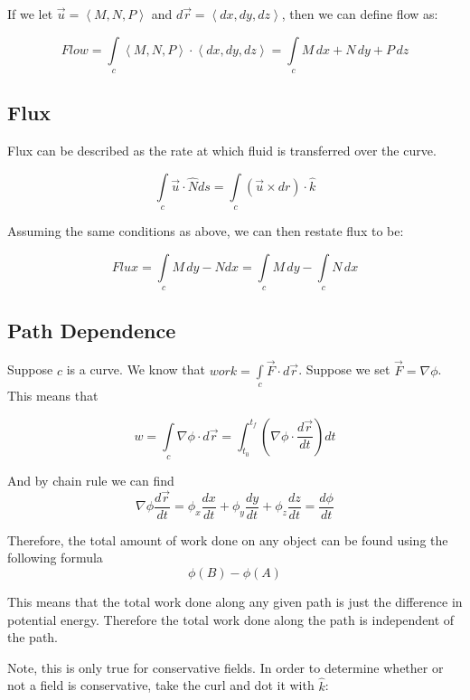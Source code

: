 \documentclass{article}
\newcommand{\nvec}[1]{\left\langle #1 \right\rangle}
\begin{document}
    If we let $ \vec{u} = \nvec{M, N, P} $ and $ d\vec{r} = \nvec{dx, dy, dz} $, then we can define flow as:

    \begin{equation}
    Flow = \int\limits_c \nvec{M, N, P} \cdot \nvec{dx, dy, dz} = \int\limits_c M \, dx + N \, dy + P \, dz
    \end{equation}

    \subsection{Flux}
    Flux can be described as the rate at which fluid is transferred over the curve.

    \begin{equation}
    \int\limits_c \vec{u} \cdot \hat{N} ds = \int\limits_c \left( \vec{u} \times dr \right) \cdot \hat{k}
    \end{equation}

    Assuming the same conditions as above, we can then restate flux to be:

    \begin{equation}
    Flux = \int\limits_c M \, dy - Ndx = \int\limits_c M \, dy - \int\limits_c N \, dx
    \end{equation}

    \subsection{Path Dependence}
    Suppose $c$ is a curve. We know that $work=\int\limits_c\vec{F}\cdot d\vec{r}$. Suppose we set $\vec{F}=\nabla\phi$. This means that

    \[
    w=\int\limits_c\nabla\phi\cdot d\vec{r} = \int_{t_0}^{t_f} (\nabla\phi \cdot \frac{d\vec{r}}{dt})dt
    \]

    And by chain rule we can find
    \[
    \nabla \phi \frac{d\vec{r}}{dt} = \phi_x \frac{dx}{dt} + \phi_y \frac{dy}{dt} + \phi_z \frac{dz}{dt} = \frac{d\phi}{dt}
    \]

    Therefore, the total amount of work done on any object can be found using the following formula
    \[
    \phi (B) - \phi (A)
    \]

    This means that the total work done along any given path is just the difference in potential energy. Therefore the total work done along the path is independent of the path.

    Note, this is only true for conservative fields. In order to determine whether or not a field is conservative, take the curl and dot it with $\hat{k}$:
\end{document}
